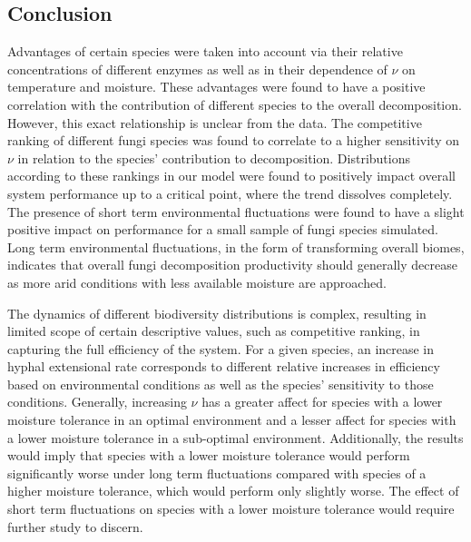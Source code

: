 \documentclass[12pt]{article}
\newenvironment{ColumnFigure}
{\par\medskip\noindent\minipage{\linewidth}}
{\endminipage\par\medskip}
\begin{document}
\begin{multicols}{2}
\section{Conclusion}
Advantages of certain species were taken into account via their relative concentrations of different enzymes as well as in their dependence of $\nu$ on temperature and moisture. These advantages were found to have a positive correlation with the contribution of different species to the overall decomposition. However, this exact relationship is unclear from the data. The competitive ranking of different fungi species was found to correlate to a higher sensitivity on $\nu$ in relation to the species' contribution to decomposition. Distributions according to these rankings in our model were found to positively impact overall system performance up to a critical point, where the trend dissolves completely. The presence of short term environmental fluctuations were found to have a slight positive impact on performance for a small sample of fungi species simulated. Long term environmental fluctuations, in the form of transforming overall biomes, indicates that overall fungi decomposition productivity should generally decrease as more arid conditions with less available moisture are approached.

The dynamics of different biodiversity distributions is complex, resulting in limited scope of certain descriptive values, such as competitive ranking, in capturing the full efficiency of the system. For a given species, an increase in hyphal extensional rate corresponds to different relative increases in efficiency based on environmental conditions as well as the species' sensitivity to those conditions. Generally, increasing $\nu$ has a greater affect for species with a lower moisture tolerance in an optimal environment and a lesser affect for species with a lower moisture tolerance in a sub-optimal environment. Additionally, the results would imply that species with a lower moisture tolerance would perform significantly worse under long term fluctuations compared with species of a higher moisture tolerance, which would perform only slightly worse. The effect of short term fluctuations on species with a lower moisture tolerance would require further study to discern. 

\end{multicols}
\newpage
\appendix
\end{document}

